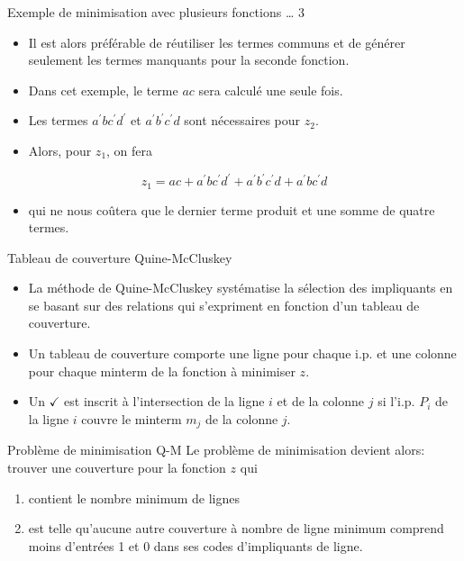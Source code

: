 \documentclass[presentation]{beamer}
\begin{document}
\begin{frame}[label={sec:orgfa53318}]{Exemple de minimisation avec plusieurs fonctions \ldots{} 3}
\begin{itemize}
\item Il est alors préférable de réutiliser les termes communs et de générer seulement les termes manquants pour la seconde fonction.

\item Dans cet exemple, le terme \(a c\) sera calculé une seule fois.

\item Les termes \(a^{\prime} b c^{\prime} d^{\prime}\) et \(a^{\prime} b^{\prime} c^{\prime} d\) sont nécessaires pour \(z_2\).

\item Alors, pour \(z_1\), on fera
\end{itemize}

$$ z_1 = a c + a^{\prime} b c^{\prime} d^{\prime} + a^{\prime} b^{\prime} c^{\prime} d + a^{\prime} b c^{\prime} d $$

\begin{itemize}
\item qui ne nous coûtera que le dernier terme produit et une somme de quatre termes.
\end{itemize}
\end{frame}


\begin{frame}[label={sec:orga7584ef}]{Tableau de couverture Quine-McCluskey}
\begin{itemize}
\item La méthode de Quine-McCluskey systématise la sélection des impliquants en se basant sur des relations qui s'expriment en fonction d'un tableau de couverture.

\item Un \alert{tableau de couverture} comporte une ligne pour chaque i.p. et une colonne pour chaque minterm de la fonction à minimiser \(z\).

\item Un \(\checkmark\) est inscrit à l'intersection de la ligne \(i\) et de la colonne \(j\) si l'i.p.  \(P_i\) de la ligne \(i\) couvre le minterm \(m_j\) de la colonne \(j\).
\end{itemize}
\end{frame}

\begin{frame}[label={sec:org7b56068}]{Problème de minimisation Q-M}
Le problème de minimisation devient alors: trouver une couverture pour
la fonction \(z\) qui

\begin{enumerate}
\item contient le nombre minimum de lignes

\item est telle qu'aucune autre couverture à nombre de ligne minimum
comprend moins d'entrées 1 et 0 dans ses codes d'impliquants de
ligne.
\end{enumerate}
\end{frame}
\end{document}
